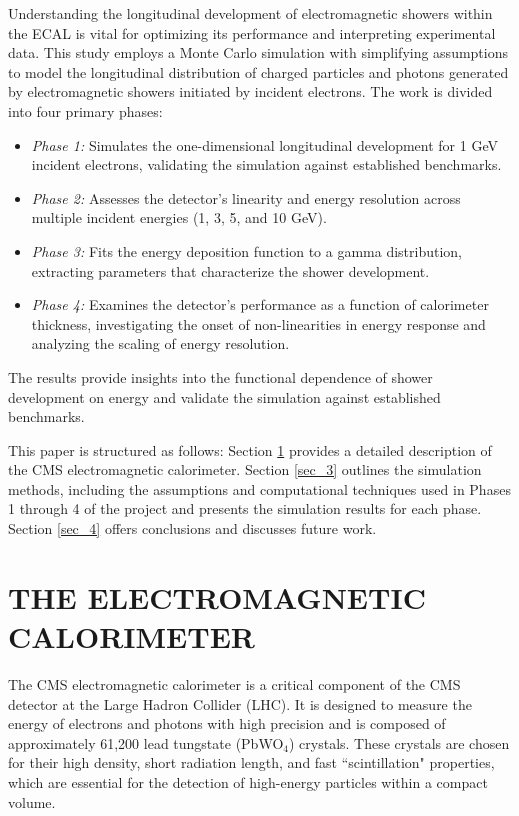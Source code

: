\documentclass[twocolumn]{aastex631}
\begin{document}
Understanding the longitudinal development of electromagnetic showers within
the ECAL is vital for optimizing its performance and interpreting experimental
data. This study employs a Monte Carlo simulation with simplifying assumptions
to model the longitudinal distribution of charged particles and photons
generated by electromagnetic showers initiated by incident electrons. The work
is divided into four primary phases:

\begin{itemize}
    \item[1.] \textit{Phase 1:} Simulates the one-dimensional longitudinal
        development for 1 GeV
        incident electrons, validating the simulation against established
        benchmarks. 
    \item[2.] \textit{Phase 2:} Assesses the detector’s linearity and energy
        resolution across multiple incident energies (1, 3, 5, and 10 GeV).
    \item[3.] \textit{Phase 3:} Fits the energy deposition function to a gamma
        distribution, extracting parameters that characterize the shower
        development. 
    \item[4.] \textit{Phase 4:} Examines the detector’s performance as a
        function of calorimeter thickness, investigating the onset of
        non-linearities in energy response and analyzing the scaling of energy
        resolution.
\end{itemize}

The results provide insights into the functional dependence of shower
development on energy and validate the simulation against established
benchmarks. 

This paper is structured as follows: Section \ref{sec_2} provides a detailed
description of the CMS electromagnetic calorimeter. Section \ref{sec_3} outlines
the simulation methods, including the assumptions and computational techniques
used in Phases 1 through 4 of the project and presents the
simulation results for each phase. Section \ref{sec_4} offers conclusions and
discusses future work. 


\section{THE ELECTROMAGNETIC CALORIMETER} \label{sec_2}

The CMS electromagnetic calorimeter is a critical component of the CMS detector
at the Large Hadron Collider (LHC). It is designed to measure the energy of
electrons and photons with high precision and is composed of approximately
61,200 lead tungstate (PbWO$_\text{4}$) crystals. These crystals are chosen for their high
density, short radiation length, and fast ``scintillation" properties, which are essential
for the detection of high-energy particles within a compact volume.
\end{document}
